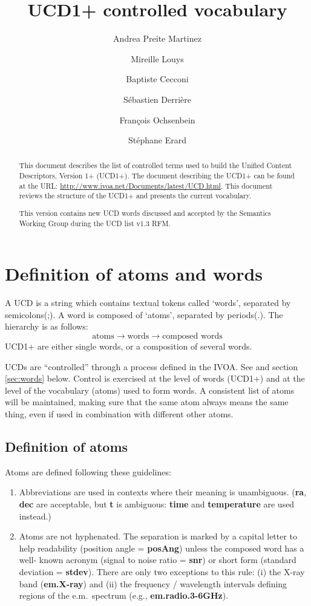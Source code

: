 \documentclass[11pt,a4paper]{ivoa}
\title{UCD1+ controlled vocabulary}
\author{Andrea Preite Martinez}
\author{Mireille Louys}
\author{Baptiste Cecconi}
\author{S\'ebastien Derri\`ere}
\author{Fran\c cois Ochsenbein}
\author{St\'ephane Erard}
\begin{document}
\begin{abstract}
This document describes the list of controlled terms used to build the Unified Content Descriptors, Version 1+ (UCD1+). 
The document describing the UCD1+ can be found at the URL: \url{http://www.ivoa.net/Documents/latest/UCD.html}. This 
document reviews the structure of the UCD1+ and presents the current vocabulary.  

This version contains new UCD words discussed and accepted by the Semantics Working Group during the UCD list v1.3 RFM.

\end{abstract} 

\section{Definition of atoms and words}
A UCD is a string which contains textual tokens called `words', separated by semicolons(;). A word is composed of 
`atoms', separated by periods(.). The hierarchy is as follows: 
$$
\textrm{atoms} \rightarrow \textrm{words} \rightarrow \textrm{composed words}
$$
UCD1+ are either single words, or a composition of several words.

UCDs are ``controlled'' through a process defined in the IVOA. See \citet{std:UCD} and section \ref{sec:words} below. 
Control is exercised at the level of words (UCD1+) and at the level of the vocabulary (atoms) used to form words. A 
consistent list of atoms will be maintained, making sure that the same atom always means the same thing, even if used 
in combination with different other atoms. 

\subsection{Definition of atoms}
Atoms are defined following these guidelines:
\begin{enumerate}
\item Abbreviations are used in contexts where their meaning is unambiguous. ({\bf ra}, {\bf dec} are 
acceptable, but {\bf t} is ambiguous: {\bf time} and {\bf temperature} are used instead.)
\item Atoms are not hyphenated. The separation is marked by a capital letter to help readability 
(position angle = {\bf posAng}) unless the composed word has a well- known acronym (signal to noise ratio = 
{\bf snr}) or short form (standard deviation = {\bf stdev}). There are only two exceptions to this rule: 
(i) the X-ray band ({\bf em.X-ray}) and (ii) the frequency / wavelength intervals defining regions of the 
e.m.~spectrum (e.g., {\bf em.radio.3-6GHz}).
\end{enumerate}
\end{document}
